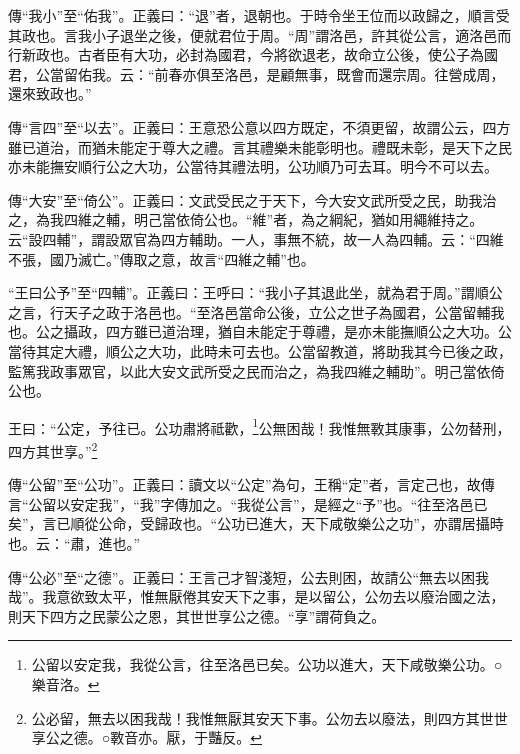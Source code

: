 {\noindent\zhuan{}\fzbyks 傳“我小”至“佑我”。正義曰：“退”者，退朝也。于時令坐王位而以政歸之，順言受其政也。言我小子退坐之後，便就君位于周。“周”謂洛邑，許其從公言，適洛邑而行新政也。古者臣有大功，必封為國君，今將欲退老，故命立公後，使公子為國君，公當留佑我。云：“前春亦俱至洛邑，是顧無事，既會而還宗周。往營成周，還來致政也。” \par}

{\noindent\zhuan{}\fzbyks 傳“言四”至“以去”。正義曰：王意恐公意以四方既定，不須更留，故謂公云，四方雖已道治，而猶未能定于尊大之禮。言其禮樂未能彰明也。禮既未彰，是天下之民亦未能撫安順行公之大功，公當待其禮法明，公功順乃可去耳。明今不可以去。 \par}

{\noindent\zhuan{}\fzbyks 傳“大安”至“倚公”。正義曰：文武受民之于天下，今大安文武所受之民，助我治之，為我四維之輔，明己當依倚公也。“維”者，為之綱紀，猶如用繩維持之。云“設四輔”，謂設眾官為四方輔助。一人，事無不統，故一人為四輔。云：“四維不張，國乃滅亡。”傳取之意，故言“四維之輔”也。 \par}

{\noindent\shu{}\fzkt “王曰公予”至“四輔”。正義曰：王呼曰：“我小子其退此坐，就為君于周。”謂順公之言，行天子之政于洛邑也。“至洛邑當命公後，立公之世子為國君，公當留輔我也。公之攝政，四方雖已道治理，猶自未能定于尊禮，是亦未能撫順公之大功。公當待其定大禮，順公之大功，此時未可去也。公當留教道，將助我其今已後之政，監篤我政事眾官，以此大安文武所受之民而治之，為我四維之輔助”。明己當依倚公也。 \par}

王曰：“公定，予往已。公功肅將祗歡，\footnote{公留以安定我，我從公言，往至洛邑已矣。公功以進大，天下咸敬樂公功。○樂音洛。}公無困哉！我惟無斁其康事，公勿替刑，四方其世享。”\footnote{公必留，無去以困我哉！我惟無厭其安天下事。公勿去以廢法，則四方其世世享公之德。○斁音亦。厭，于豔反。}


{\noindent\zhuan{}\fzbyks 傳“公留”至“公功”。正義曰：讀文以“公定”為句，王稱“定”者，言定己也，故傳言“公留以安定我”，“我”字傳加之。“我從公言”，是經之“予”也。“往至洛邑已矣”，言已順從公命，受歸政也。“公功已進大，天下咸敬樂公之功”，亦謂居攝時也。云：“肅，進也。” \par}

{\noindent\zhuan{}\fzbyks 傳“公必”至“之德”。正義曰：王言己才智淺短，公去則困，故請公“無去以困我哉”。我意欲致太平，惟無厭倦其安天下之事，是以留公，公勿去以廢治國之法，則天下四方之民蒙公之恩，其世世享公之德。“享”謂荷負之。 \par}

